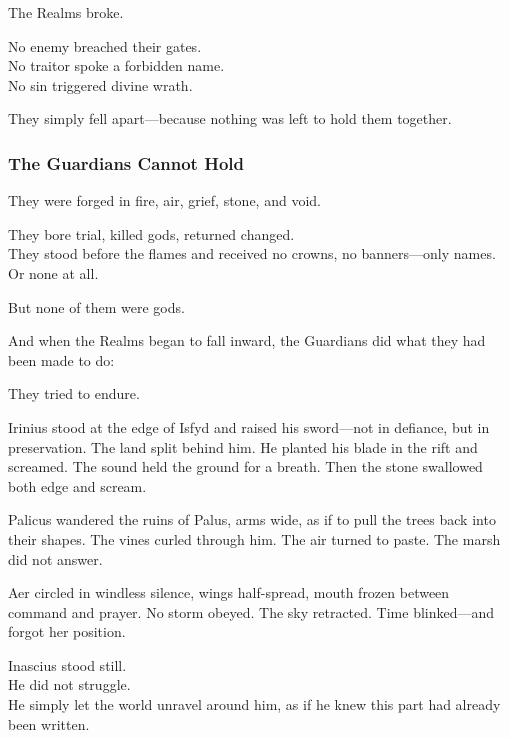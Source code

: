\documentclass[12pt]{article}
\begin{document}
\vspace{0.5em}
The Realms broke.

\vspace{0.5em}
No enemy breached their gates.\\
No traitor spoke a forbidden name.\\
No sin triggered divine wrath.

\vspace{0.5em}
They simply fell apart---because nothing was left to hold them together.

\dotfill

\subsubsection*{The Guardians Cannot Hold}

They were forged in fire, air, grief, stone, and void.

\vspace{0.5em}
They bore trial, killed gods, returned changed.\\
They stood before the flames and received no crowns, no banners---only names.\\
Or none at all.

\vspace{0.5em}
But none of them were gods.

\vspace{0.5em}
And when the Realms began to fall inward, the Guardians did what they had been made to do:

\vspace{0.5em}
They tried to endure.

\vspace{0.5em}
Irinius stood at the edge of Isfyd and raised his sword---not in defiance, but in preservation. The land split behind him. He planted his blade in the rift and screamed. The sound held the ground for a breath. Then the stone swallowed both edge and scream.

\vspace{0.5em}
Palicus wandered the ruins of Palus, arms wide, as if to pull the trees back into their shapes. The vines curled through him. The air turned to paste. The marsh did not answer.

\vspace{0.5em}
Aer circled in windless silence, wings half-spread, mouth frozen between command and prayer. No storm obeyed. The sky retracted. Time blinked---and forgot her position.

\vspace{0.5em}
Inascius stood still.\\
He did not struggle.\\
He simply let the world unravel around him, as if he knew this part had already been written.
\end{document}
